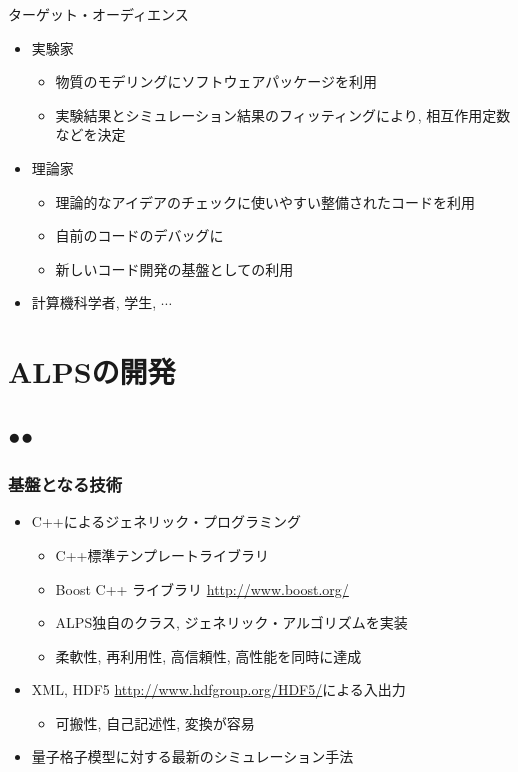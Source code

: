 \begin{frame}{ターゲット・オーディエンス}
  \begin{itemize}
    \setlength{\itemsep}{1em}
  \item 実験家
    \begin{itemize}
    \item 物質のモデリングにソフトウェアパッケージを利用
    \item 実験結果とシミュレーション結果のフィッティングにより, 相互作用定数などを決定
    \end{itemize}
  \item 理論家
    \begin{itemize}
    \item 理論的なアイデアのチェックに使いやすい整備されたコードを利用
    \item 自前のコードのデバッグに
    \item 新しいコード開発の基盤としての利用
    \end{itemize}
  \item 計算機科学者, 学生, $\cdots$
  \end{itemize}
\end{frame}

\section{ALPSの開発}
\subsection*{{\protect\color{red}●}{\protect\color{blue}●}}

\begin{frame}
  \frametitle{基盤となる技術}
  \begin{itemize}
    \setlength{\itemsep}{1em}
  \item C++によるジェネリック・プログラミング
    \begin{itemize}
    \item C++標準テンプレートライブラリ
    \item Boost C++ ライブラリ \url{http://www.boost.org/}
    \item ALPS独自のクラス, ジェネリック・アルゴリズムを実装
    \item 柔軟性, 再利用性, 高信頼性, 高性能を同時に達成
    \end{itemize}
  \item XML, HDF5 \url{http://www.hdfgroup.org/HDF5/}による入出力
    \begin{itemize}
    \item 可搬性, 自己記述性, 変換が容易
    \end{itemize}
  \item 量子格子模型に対する最新のシミュレーション手法
  \end{itemize}
\end{frame}

